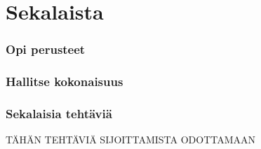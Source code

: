 \section{Sekalaista}


\begin{tehtavasivu}

\subsubsection*{Opi perusteet}

\subsubsection*{Hallitse kokonaisuus}

\subsubsection*{Sekalaisia tehtäviä}

TÄHÄN TEHTÄVIÄ SIJOITTAMISTA ODOTTAMAAN

\end{tehtavasivu}